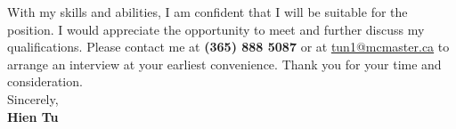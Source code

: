 \documentclass[12pt,letterpaper,sans]{moderncv} %
\begin{document}


With my skills and abilities, I am confident that I will be suitable for the position. I would appreciate the opportunity to meet and further discuss my qualifications. Please contact me at \textbf{(365) 888 5087} or at \href{mailto:tun1@mcmaster.ca}{tun1@mcmaster.ca} to arrange an interview at your earliest convenience. Thank you for your time and consideration. \\

Sincerely, \\
\textbf{Hien Tu}


\newpage

\end{document}
